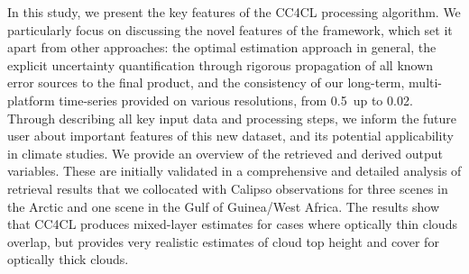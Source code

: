 In this study, we present the key features of the CC4CL processing algorithm. We particularly focus on discussing the novel features of the framework, which set it apart from other approaches: the optimal estimation approach in general, the explicit uncertainty quantification through rigorous propagation of all known error sources to the final product, and the consistency of our long-term, multi-platform time-series provided on various resolutions, from 0.5\textdegree\ up to 0.02\textdegree. Through describing all key input data and processing steps, we inform the future user about important features of this new dataset, and its potential applicability in climate studies. We provide an overview of the retrieved and derived output variables. These are initially validated in a comprehensive and detailed analysis of retrieval results that we collocated with Calipso observations for three scenes in the Arctic and one scene in the Gulf of Guinea/West Africa. The results show that CC4CL produces mixed-layer estimates for cases where optically thin clouds overlap, but provides very realistic estimates of cloud top height and cover for optically thick clouds.
